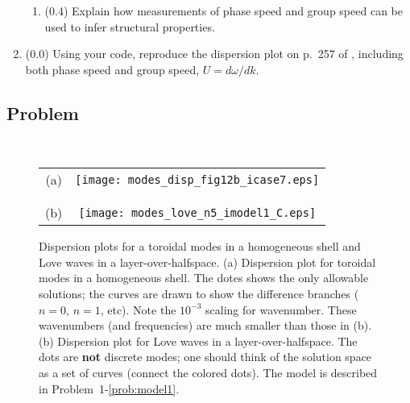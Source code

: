 \documentclass[11pt,titlepage,fleqn]{article}
\begin{document}
\begin{enumerate}
\begin{enumerate}
\item (0.4) Explain how measurements of phase speed and group speed can be used to infer structural properties.
\end{enumerate}


\item (0.0) Using your code, reproduce the dispersion plot on p.~257 of \citet{AkiRichardsE2}, including both phase speed and group speed, $U = d\omega/dk$.


\end{enumerate}


\subsection*{Problem} \howmuchtime\

\pagebreak






\clearpage\pagebreak
\begin{figure}
\centering
\begin{tabular}{cc}
(a) & \texttt{[image: modes\_disp\_fig12b\_icase7.eps]} \\
& \\ & \\
(b) & \texttt{[image: modes\_love\_n5\_imodel1\_C.eps]} 
\end{tabular}
\caption[]
{{
Dispersion plots for a toroidal modes in a homogeneous shell and Love waves in a layer-over-halfspace.
(a) Dispersion plot for toroidal modes in a homogeneous shell. The dotes shows the only allowable solutions; the curves are drawn to show the difference branches ($n=0$, $n=1$, etc). 
Note the $10^{-3}$ scaling for wavenumber. These wavenumbers (and frequencies) are much smaller than those in (b).
(b) Dispersion plot for Love waves in a layer-over-halfspace. The dots are {\bf not} discrete modes; one should think of the solution space as a set of curves (\ie connect the colored dots).
The model is described in Problem~1-\ref{prob:model1}.
\label{fig:dots}
}}
\end{figure}
\end{document}

